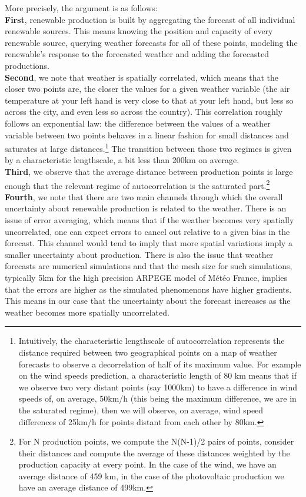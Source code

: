 More precisely, the argument is as follows: \\

\textbf{First}, renewable production is built by aggregating the forecast of all individual renewable sources. This means knowing the position and capacity of every renewable source, querying weather forecasts for all of these points, modeling the renewable's response to the forecasted weather and adding the forecasted productions. \\

\textbf{Second}, we note that weather is spatially correlated, which means that the closer two points are, the closer the values for a given weather variable (the air temperature at your left hand is very close to that at your left hand, but less so across the city, and even less so across the country). This correlation roughly follows an exponential law: the difference between the values of a weather variable between two points behaves in a linear fashion for small distances and saturates at large distances.\footnote{Intuitively, the characteristic lengthscale of autocorrelation represents the distance required between two geographical points on a map of weather forecasts to observe a decorrelation of half of its maximum value. For example on the wind speeds prediction, a characteristic length of 80 km means that if we observe two very distant points (say 1000km) to have a difference in wind speeds of, on average, 50km/h (this being the maximum difference, we are in the saturated regime), then we will observe, on average, wind speed differences of 25km/h for points distant from each other by 80km.} The transition between those two regimes is given by a characteristic lengthscale, a bit less than 200km on average. \\

\textbf{Third}, we observe that the average distance between production points is large enough that the relevant regime of autocorrelation is the saturated part.\footnote{For N production points, we compute the N(N-1)/2 pairs of points, consider their distances and compute the average of these distances weighted by the production capacity at every point. In the case of the wind, we have an average distance of 459 km, in the case of the photovoltaic production we have an average distance of 499km.} \\

\textbf{Fourth}, we note that there are two main channels through which the overall uncertainty about renewable production is related to the weather. There is an issue of error averaging, which means that if the weather becomes very spatially uncorrelated, one can expect errors to cancel out relative to a given bias in the forecast. This channel would tend to imply that more spatial variations imply a smaller uncertainty about production. There is also the issue that weather forecasts are numerical simulations and that the mesh size for such simulations, typically 5km for the high precision ARPEGE model of Météo France, implies that the errors are higher as the simulated phenomenons have higher gradients. This means in our case that the uncertainty about the forecast increases as the weather becomes more spatially uncorrelated. \\

